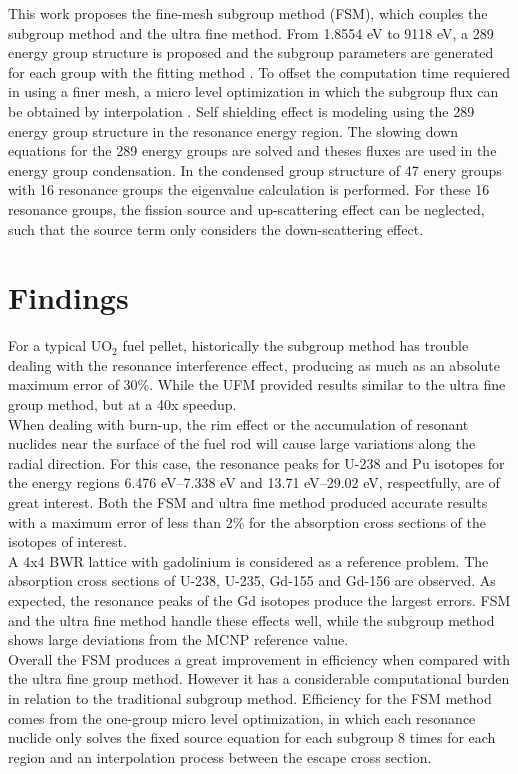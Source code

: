 \documentclass[10pt]{article}
\begin{document}
This work proposes the fine-mesh subgroup method (FSM), which couples the subgroup method and the ultra fine method. From 1.8554 eV to 9118 eV, a 289 energy group structure is proposed and the subgroup parameters are generated for each group with the fitting method \cite{hebert2009applied}. To offset the computation time requiered in using a finer mesh, a micro level optimization in which the subgroup flux can be obtained by interpolation \cite{park2018effective}. Self shielding effect is modeling using the 289 energy group structure in the resonance energy region. The slowing down equations for the 289 energy groups are solved and theses fluxes are used in the energy group condensation. In the condensed group structure of 47 enery groups with 16 resonance groups \cite{kim2015development} the eigenvalue calculation is performed. For these 16 resonance groups, the fission source and up-scattering effect can be neglected, such that the source term only considers the down-scattering effect. 

\section{Findings}

For a typical UO$_2$ fuel pellet, historically the subgroup method has trouble dealing with the resonance interference effect, producing as much as an absolute maximum error of 30\%. While the UFM provided results similar to the ultra fine group method, but at a 40x speedup. \\

When dealing with burn-up, the rim effect or the accumulation of resonant nuclides near the surface of the fuel rod will cause large variations along the radial direction. For this case, the resonance peaks for U-238 and Pu isotopes for the energy regions 6.476 eV–7.338 eV and 13.71 eV–29.02 eV, respectfully, are of great interest. Both the FSM and ultra fine method produced accurate results with a maximum error of less than 2\% for the absorption cross sections of the isotopes of interest. \\

A 4x4 BWR lattice with gadolinium is considered as a reference problem. The absorption cross sections of U-238, U-235, Gd-155 and Gd-156 are observed. As expected, the resonance peaks of the Gd isotopes produce the largest errors. FSM and the ultra fine method handle these effects well, while the subgroup method shows large deviations from the MCNP reference value. \\

Overall the FSM produces a great improvement in efficiency when compared with the ultra fine group method. However it has a considerable computational burden in relation to the traditional subgroup method. Efficiency for the FSM method comes from the one-group micro level optimization, in which each resonance nuclide only solves the fixed source equation for each subgroup 8 times for each region and an interpolation process between the escape cross section. 



\end{document}
